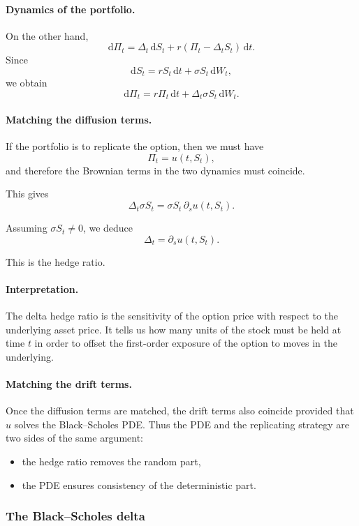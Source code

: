 \documentclass[11pt]{article}
\theoremstyle{plain}
\theoremstyle{definition}
\theoremstyle{remark}
\begin{document}
\paragraph{Dynamics of the portfolio.}
On the other hand,
\[
\mathrm{d}\Pi_t
=
\Delta_t\,\mathrm{d}S_t+r(\Pi_t-\Delta_t S_t)\,\mathrm{d}t.
\]
Since
\[
\mathrm{d}S_t=rS_t\,\mathrm{d}t+\sigma S_t\,\mathrm{d}W_t,
\]
we obtain
\[
\mathrm{d}\Pi_t
=
r\Pi_t\,\mathrm{d}t+\Delta_t \sigma S_t\,\mathrm{d}W_t.
\]

\paragraph{Matching the diffusion terms.}
If the portfolio is to replicate the option, then we must have
\[
\Pi_t=u(t,S_t),
\]
and therefore the Brownian terms in the two dynamics must coincide.

This gives
\[
\Delta_t \sigma S_t
=
\sigma S_t\,\partial_s u(t,S_t).
\]

Assuming \(\sigma S_t\neq 0\), we deduce
\[
\boxed{
\Delta_t=\partial_s u(t,S_t).
}
\]

This is the hedge ratio.

\paragraph{Interpretation.}
The delta hedge ratio is the sensitivity of the option price with
respect to the underlying asset price.
It tells us how many units of the stock must be held at time \(t\) in
order to offset the first-order exposure of the option to moves in the
underlying.

\paragraph{Matching the drift terms.}
Once the diffusion terms are matched, the drift terms also coincide
provided that \(u\) solves the Black--Scholes PDE.
Thus the PDE and the replicating strategy are two sides of the same
argument:
\begin{itemize}[leftmargin=1.4em]
    \item the hedge ratio removes the random part,
    \item the PDE ensures consistency of the deterministic part.
\end{itemize}

\subsubsection{The Black--Scholes delta}
\end{document}
